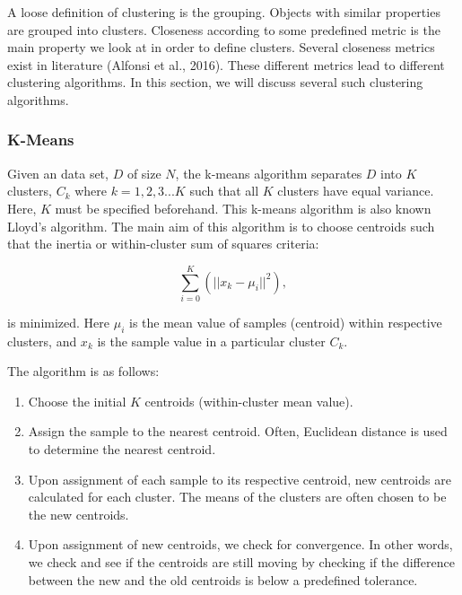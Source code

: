 \documentclass[11pt]{article}
\begin{document}
A loose definition of clustering is the grouping. Objects with similar properties are grouped into clusters. Closeness according to some predefined metric is the main property we look at in order to define clusters. Several closeness metrics exist in literature (Alfonsi et al., 2016). These different metrics lead to different clustering algorithms. In this section, we will discuss several such clustering algorithms.

\subsubsection{K-Means}

Given an data set, $D$ of size $N$, the k-means algorithm separates $D$ into $K$ clusters, $C_k$ where $k = 1,2,3...K$ such that all $K$ clusters have equal variance. Here, $K$ must be specified beforehand. This k-means algorithm is also known Lloyd's algorithm. The main aim of this algorithm is to choose centroids such that the inertia or within-cluster sum of squares criteria:

\begin{equation}
\label{criteria}
\sum_{i=0}^{K} \left(|| x_k - \mu_i||^2 \right),
\end{equation} 

is minimized. Here $\mu_i$ is the mean value of samples (centroid) within respective clusters, and $x_k$ is the sample value in a particular cluster $C_k$.

The algorithm is as follows:

\begin{enumerate}

\item Choose the initial $K$ centroids (within-cluster mean value).

\item Assign the sample to the nearest centroid. Often, Euclidean distance is used to determine the nearest centroid. 

\item Upon assignment of each sample to its respective centroid, new centroids are calculated for each cluster. The means of the clusters are often chosen to be the new centroids. 
  
\item Upon assignment of new centroids, we check for convergence. In other words, we check and see if the centroids are still moving by checking if the difference between the new and the old centroids is below a predefined tolerance. 

\end{enumerate}
\end{document}

